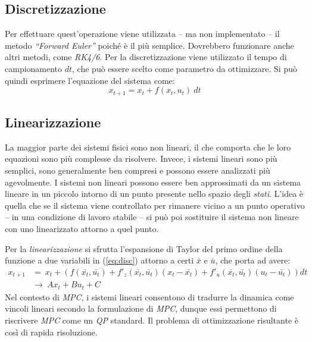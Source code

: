 \subsection{Discretizzazione}
\label{sect:disc}
Per effettuare quest'operazione viene utilizzata -- ma non implementato -- il metodo 
\textit{``Forward Euler''} poiché è il più semplice. Dovrebbero funzionare anche altri metodi, come \textit{RK4/6}.
Per la discretizzazione viene utilizzato il tempo di campionamento $dt$, che può essere scelto come parametro da ottimizzare. 
Si può quindi esprimere l’equazione del sistema come:
\begin{equation}
\label{eq:disc}
x_{t+1} = x_t + f(x_t, u_t) \ dt
\end{equation}

\subsection{Linearizzazione}
\label{sect:lin}
La maggior parte dei sistemi fisici sono non lineari, il che comporta che le loro equazioni sono 
più complesse da risolvere. Invece, i sistemi lineari sono più semplici, sono generalmente ben 
compresi e possono essere analizzati più agevolmente.
I sistemi non lineari possono essere ben approssimati da un sistema lineare in un piccolo intorno 
di un punto presente nello spazio degli \textit{stati}.
L'idea è quella che se il sistema viene controllato per rimanere vicino
a un punto operativo -- in una condizione di lavoro stabile -- si può poi 
sostituire il sistema non lineare con uno linearizzato attorno a quel punto.

Per la \textit{linearizzazione} si sfrutta l’espansione di Taylor del primo 
ordine della funzione a due variabili in (\ref{eq:disc}) attorno a certi $\bar{x}$ e $\bar{u}$, che
porta ad avere: 
\[
\begin{aligned}
x_{t+1}& = \ x_t + (f(\bar{x_t}, \bar{u_t}) + f'_z(\bar{x_t}, \bar{u_t})(x_t - \bar{x_t}) + f'_u(\bar{x_t}, \bar{u_t})(u_t - \bar{u_t}))dt \\
& \rightarrow \ A x_t + B u_t + C
\end{aligned}
\]
Nel contesto di \textit{MPC}, i sistemi lineari consentono di tradurre la dinamica come vincoli 
lineari secondo la formulazione di \textit{MPC}, dunque essi permettono di riscrivere \textit{MPC} come un \textit{QP} standard.
Il problema di ottimizzazione risultante è così di rapida risoluzione.


